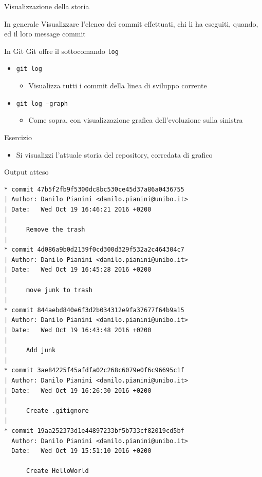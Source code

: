 \documentclass[presentation]{beamer}
\begin{document}
\begin{frame}{Visualizzazione della storia}
	\begin{block}{In generale}
		Visualizzare l'elenco dei commit effettuati, chi li ha eseguiti, quando, ed il loro message commit
	\end{block}
	\begin{block}{In Git}
		Git offre il sottocomando \texttt{log}
		\begin{itemize}
			\item \texttt{git log}
			\begin{itemize}
				\item Visualizza tutti i commit della linea di sviluppo corrente
			\end{itemize}
			\item \texttt{git log --graph}
			\begin{itemize}
				\item Come sopra, con visualizzazione grafica dell'evoluzione sulla sinistra 
			\end{itemize}
		\end{itemize}
	\end{block}
	\begin{block}{Esercizio}	
		\begin{itemize}
			\item Si visualizzi l'attuale storia del repository, corredata di grafico
		\end{itemize}
	\end{block}
	\begin{block}{Output atteso}
		\begin{Verbatim}[fontsize=\tiny]
* commit 47b5f2fb9f5300dc8bc530ce45d37a86a0436755
| Author: Danilo Pianini <danilo.pianini@unibo.it>
| Date:   Wed Oct 19 16:46:21 2016 +0200
| 
|     Remove the trash
|  
* commit 4d086a9b0d2139f0cd300d329f532a2c464304c7
| Author: Danilo Pianini <danilo.pianini@unibo.it>
| Date:   Wed Oct 19 16:45:28 2016 +0200
| 
|     move junk to trash
|  
* commit 844aebd840e6f3d2b034312e9fa37677f64b9a15
| Author: Danilo Pianini <danilo.pianini@unibo.it>
| Date:   Wed Oct 19 16:43:48 2016 +0200
| 
|     Add junk
|  
* commit 3ae84225f45afdfa02c268c6079e0f6c96695c1f
| Author: Danilo Pianini <danilo.pianini@unibo.it>
| Date:   Wed Oct 19 16:26:30 2016 +0200
| 
|     Create .gitignore
|  
* commit 19aa252373d1e44897233bf5b733cf82019cd5bf
  Author: Danilo Pianini <danilo.pianini@unibo.it>
  Date:   Wed Oct 19 15:51:10 2016 +0200
  
      Create HelloWorld
		\end{Verbatim}
	\end{block}
\end{frame}
\end{document}
